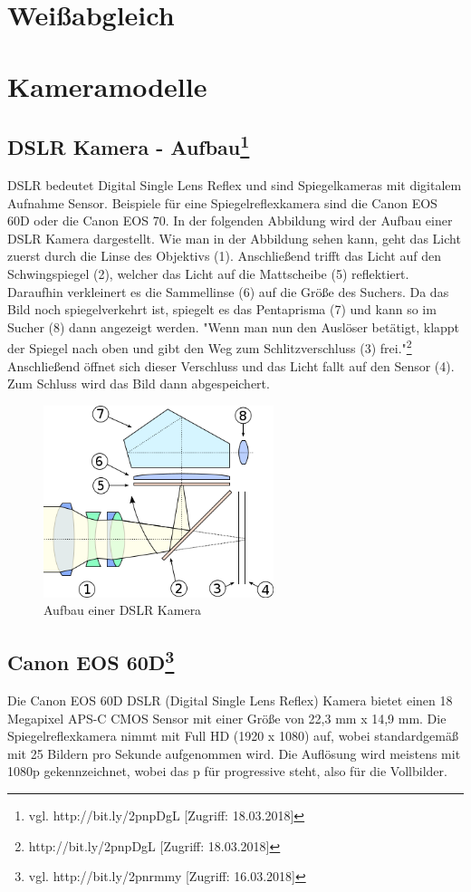 \section{Weißabgleich}
\section{Kameramodelle}
\subsection[DSLR Kamera - Aufbau]{DSLR Kamera - Aufbau\protect\footnote{\label{}vgl. http://bit.ly/2pnpDgL [Zugriff: 18.03.2018]}}
DSLR bedeutet Digital Single Lens Reflex und sind Spiegelkameras mit digitalem Aufnahme Sensor. Beispiele für eine Spiegelreflexkamera sind die Canon EOS 60D oder die Canon EOS 70. In der folgenden Abbildung wird der Aufbau einer DSLR Kamera dargestellt. Wie man in der Abbildung sehen kann, geht das Licht zuerst durch die Linse des Objektivs (1). Anschließend trifft das Licht auf den Schwingspiegel (2), welcher das Licht auf die Mattscheibe (5) reflektiert. Daraufhin verkleinert es die Sammellinse (6) auf die Größe des Suchers. Da das Bild noch spiegelverkehrt ist, spiegelt es das Pentaprisma (7) und kann so im Sucher (8) dann angezeigt werden. "Wenn man nun den Auslöser betätigt, klappt der Spiegel nach oben und gibt den Weg zum Schlitzverschluss (3) frei."\footnote{\label{}http://bit.ly/2pnpDgL [Zugriff: 18.03.2018]} Anschließend öffnet sich dieser Verschluss und das Licht fallt auf den Sensor (4). Zum Schluss wird das Bild dann abgespeichert.
\begin{figure}[H]
	\centering
	\includegraphics[width=0.6\textwidth]{abb13} 
	\caption{Aufbau einer DSLR Kamera}
\end{figure}
\subsection[Canon EOS 60D]{Canon EOS 60D\protect\footnote{\label{}vgl. http://bit.ly/2pnrmmy [Zugriff: 16.03.2018]}} Die Canon EOS 60D DSLR (Digital Single Lens Reflex) Kamera bietet einen 18 Megapixel APS-C CMOS Sensor mit einer Größe von 22,3 mm x 14,9 mm. Die Spiegelreflexkamera nimmt mit Full HD (1920 x 1080) auf, wobei standardgemäß mit 25 Bildern pro Sekunde aufgenommen wird. Die Auflösung wird meistens mit 1080p gekennzeichnet, wobei das p für progressive steht, also für die Vollbilder.
